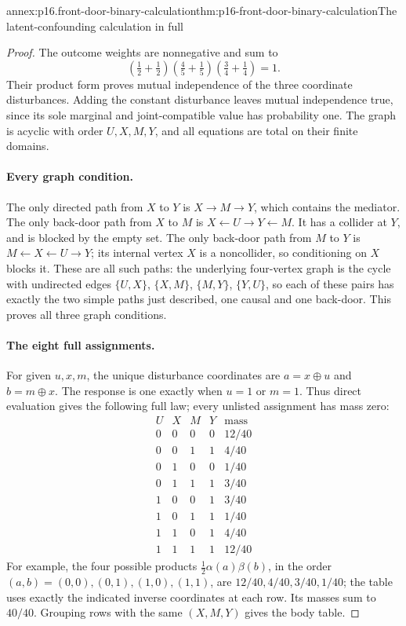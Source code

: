 \begin{annexitem}{annex:p16.front-door-binary-calculation}{thm:p16-front-door-binary-calculation}{The latent-confounding calculation in full}
\begin{proof}
The outcome weights are nonnegative and sum to
\[
 \left(\tfrac12+\tfrac12\right)
  \left(\tfrac45+\tfrac15\right)
  \left(\tfrac34+\tfrac14\right)=1.
\]
Their product form proves mutual independence of the three coordinate
disturbances. Adding the constant disturbance leaves mutual independence
true, since its sole marginal and joint-compatible value has probability
one. The graph is acyclic with order \(U,X,M,Y\), and all equations
are total on their finite domains.

\paragraph{Every graph condition.}
The only directed path from \(X\) to \(Y\) is
\(X\to M\to Y\), which contains the mediator. The only back-door
path from \(X\) to \(M\) is \(X\leftarrow U\to Y\leftarrow M\).
It has a collider at \(Y\), and is blocked by the empty set.
The only back-door path from \(M\) to \(Y\) is
\(M\leftarrow X\leftarrow U\to Y\); its internal vertex \(X\)
is a noncollider, so conditioning on \(X\) blocks it. These are
all such paths: the underlying four-vertex graph is the cycle with
undirected edges \(\{U,X\}\), \(\{X,M\}\), \(\{M,Y\}\),
\(\{Y,U\}\), so each of these
pairs has exactly the two simple paths just described, one causal
and one back-door. This proves all three graph conditions.

\paragraph{The eight full assignments.}
For given \(u,x,m\), the unique disturbance coordinates are
\(a=x\oplus u\) and \(b=m\oplus x\). The response is one
exactly when \(u=1\) or \(m=1\). Thus direct evaluation gives
the following full law; every unlisted assignment has mass zero:
\[
\begin{array}{cccc|c}
 U&X&M&Y&\text{mass}\\\hline
 0&0&0&0&12/40\\
 0&0&1&1&4/40\\
 0&1&0&0&1/40\\
 0&1&1&1&3/40\\
 1&0&0&1&3/40\\
 1&0&1&1&1/40\\
 1&1&0&1&4/40\\
 1&1&1&1&12/40
\end{array}
\]
For example, the four possible products
\(\frac12\alpha(a)\beta(b)\), in the order
\((a,b)=(0,0),(0,1),(1,0),(1,1)\), are
\(12/40,4/40,3/40,1/40\); the table uses exactly the indicated
inverse coordinates at each row. Its masses sum to \(40/40\).
Grouping rows with the same \((X,M,Y)\) gives the body table.


\end{proof}
\end{annexitem}
